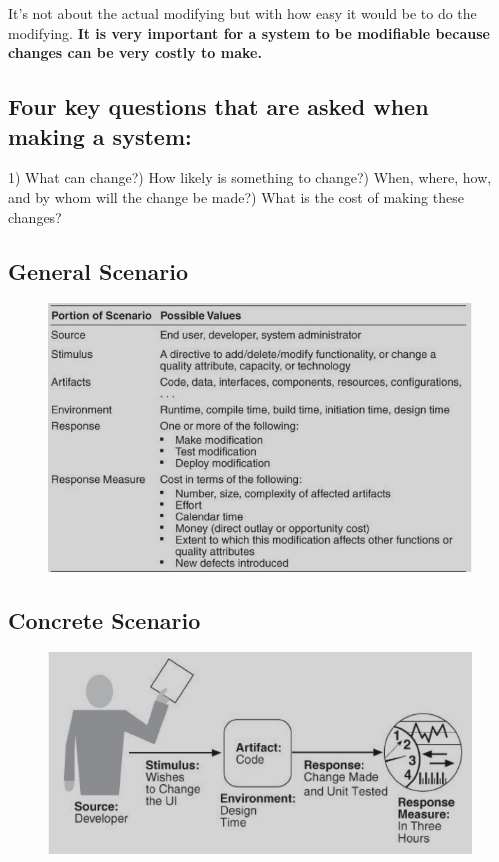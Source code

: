\documentclass[a4paper]{article}
\begin{document}
It's not about the actual modifying but with how easy it would be to do the modifying.
\textbf{It is very important for a system to be modifiable because changes can be very costly to make.}

\subsection{Four key questions that are asked when making a system:}
1)   What can change?)   How likely is something to change?)   When, where, how, and by whom will the change be made?)   What is the cost of making these changes? \newline

\subsection{General Scenario}
\hskip-3.0cm\begin{figure}[H] 
    \includegraphics[scale=0.7]{images/modifiability-general.png}
\end{figure}

\subsection{Concrete Scenario}
\begin{figure}[H]
\begin{center} 
    \includegraphics[scale=0.5]{images/modifiability-concrete.png}
\end{center}
\end{figure}
\end{document}
